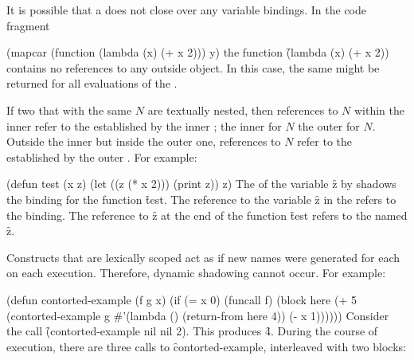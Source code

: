 It is possible that a  does not
close over any variable bindings.
In the code fragment
 
\code
 (mapcar (function (lambda (x) (+ x 2))) y)
\endcode
the function \f{(lambda (x) (+ x 2))} contains no references to any outside
object. In this case, the same  might be returned
for all evaluations of the  .

\endSubsection%
 
%
%

If two  that   with
the same  $N$ are textually nested, then references to $N$
within the inner  refer to the  established by
the inner ; the inner  for $N$
 the outer  for $N$.  Outside the inner
 but inside the outer one, references to $N$ refer to the
 established by the outer .  For example:


\code
 (defun test (x z)
   (let ((z (* x 2)))
     (print z))
   z)
\endcode
The  of the variable \f{z} by
 shadows
the  binding for the function \f{test}.  The reference to the
variable \f{z} in the   refers to the  binding.
The reference to \f{z} at the end of the function \f{test} 
refers to the  named \f{z}.

Constructs that are lexically scoped act as if new names were
generated for each  on each execution.  Therefore,
dynamic shadowing cannot occur.  For example:

\code
 (defun contorted-example (f g x)
   (if (= x 0)
       (funcall f)
       (block here
          (+ 5 (contorted-example g
                                  #'(lambda () (return-from here 4))
                                  (- x 1))))))
\endcode
Consider the call \f{(contorted-example nil nil 2)}.  This produces
\f{4}.  During the course of execution, there are three
calls to \f{contorted-example}, interleaved with two 
blocks:

